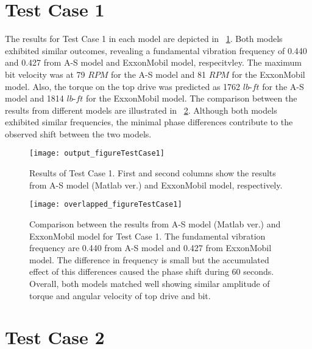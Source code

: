 \section{Test Case 1}
The results for Test Case 1 in each model are depicted in \figurename~\ref{figure_testcase1}. Both models exhibited similar outcomes, revealing a fundamental vibration frequency of 0.440 and 0.427 from A-S model and ExxonMobil model, respecitvley. The maximum bit velocity was at 79 $RPM$ for the A-S model and 81 $RPM$ for the ExxonMobil model. Also, the torque on the top drive was predicted as 1762 $lb\mbox{-}ft$ for the A-S model and 1814 $lb\mbox{-}ft$ for the ExxonMobil model. The comparison between the results from different models are illustrated in \figurename~\ref{figure_testcase1_overlapped}. Although both models exhibited similar frequencies, the minimal phase differences contribute to the observed shift between the two models.
\begin{figure}[!hbt]
  \centering
  \texttt{[image: output\_figureTestCase1]}
  \caption[Results of Test Case 1]{Results of Test Case 1. First and second columns show the results from A-S model (Matlab ver.) and ExxonMobil model, respectively.}\label{figure_testcase1}
\end{figure}
\begin{figure}
  \centering
  \texttt{[image: overlapped\_figureTestCase1]}
  \caption[Comparison of the results for Test Case 1]{Comparison between the results from A-S model (Matlab ver.) and ExxonMobil model for Test Case 1. The fundamental vibration frequency are 0.440 from A-S model and 0.427 from ExxonMobil model. The difference in frequency is small but the accumulated effect of this differences caused the phase shift during 60 seconds. Overall, both models matched well showing similar amplitude of torque and angular velocity of top drive and bit. }\label{figure_testcase1_overlapped}
\end{figure}

\section{Test Case 2}
